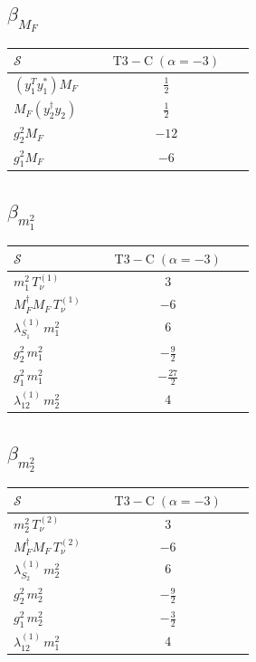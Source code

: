 \documentclass[9pt]{article}
\begin{document}
\subsection*{$ \beta_{M_F} $}
\begin{longtable}{@{}p{0.31\linewidth}c@{}}
\toprule
$\mathcal{S}$ & $ \mathrm{T3-C}\;(\alpha=-3) $ \\
\midrule
$ (y_1^T y_1^*)M_F $ & $ \frac{1}{2} $ \\
$ M_F(y_2^\dagger y_2) $ & $ \frac{1}{2} $ \\
$ g_2^2M_F $ & $ -12 $ \\
$ g_1^2M_F $ & $ -6 $ \\
\bottomrule
\end{longtable}
\subsection*{$ \beta_{m_1^{2}} $}
\begin{longtable}{@{}p{0.31\linewidth}c@{}}
\toprule
$\mathcal{S}$ & $ \mathrm{T3-C}\;(\alpha=-3) $ \\
\midrule
$ m_1^{2}\,T_{\nu}^{(1)} $ & $ 3 $ \\
$ M_F^\dagger M_F\,T_{\nu}^{(1)} $ & $ -6 $ \\
$ \lambda_{S_1}^{(1)}\,m_1^{2} $ & $ 6 $ \\
$ g_2^2\,m_1^{2} $ & $ - \frac{9}{2} $ \\
$ g_1^2\,m_1^{2} $ & $ - \frac{27}{2} $ \\
$ \lambda_{12}^{(1)}\,m_2^{2} $ & $ 4 $ \\
\bottomrule
\end{longtable}
\subsection*{$ \beta_{m_2^{2}} $}
\begin{longtable}{@{}p{0.31\linewidth}c@{}}
\toprule
$\mathcal{S}$ & $ \mathrm{T3-C}\;(\alpha=-3) $ \\
\midrule
$ m_2^{2}\,T_{\nu}^{(2)} $ & $ 3 $ \\
$ M_F^\dagger M_F\,T_{\nu}^{(2)} $ & $ -6 $ \\
$ \lambda_{S_2}^{(1)}\,m_2^{2} $ & $ 6 $ \\
$ g_2^2\,m_2^{2} $ & $ - \frac{9}{2} $ \\
$ g_1^2\,m_2^{2} $ & $ - \frac{3}{2} $ \\
$ \lambda_{12}^{(1)}\,m_1^{2} $ & $ 4 $ \\
\bottomrule
\end{longtable}
\end{document}
